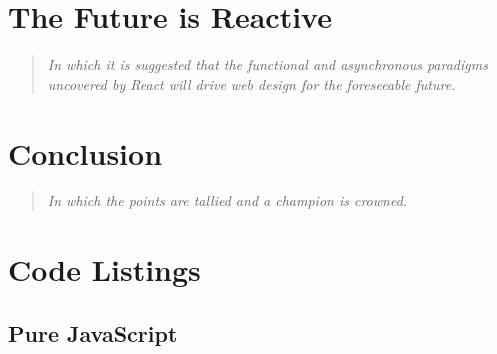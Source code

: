 \documentclass[12pt,letterpaper]{article}
\begin{document}
\section{The Future is Reactive}
\vspace{-12pt}

\begin{quote}
	\singlespacing
	\emph{In which it is suggested that the functional and asynchronous paradigms uncovered by React will drive web design for the foreseeable future.}
\end{quote}




\section{Conclusion}
\vspace{-12pt}

\begin{quote}
	\singlespacing
	\emph{In which the points are tallied and a champion is crowned.}
\end{quote}










\newpage

\appendix
\section{Code Listings}
\label{app:code}

\subsection*{Pure JavaScript}



\end{document}
